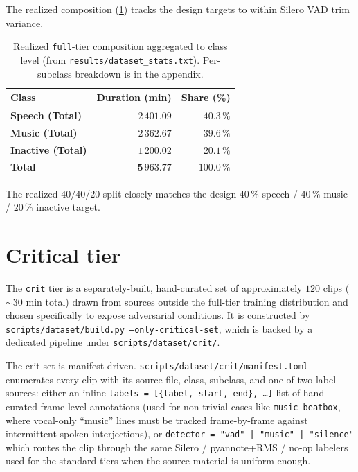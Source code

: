 The realized composition (\cref{tab:dataset_class_summary}) tracks the design targets to within Silero VAD trim variance.

\begin{table}[h]
\centering
\begin{tabular}{lrr}
\toprule
\textbf{Class} & \textbf{Duration (min)} & \textbf{Share (\%)} \\
\midrule
\textbf{Speech (Total)} & $2\,401.09$ & $40.3\,\%$ \\
\textbf{Music (Total)} & $2\,362.67$ & $39.6\,\%$ \\
\textbf{Inactive (Total)} & $1\,200.02$ & $20.1\,\%$ \\
\midrule
\textbf{Total} & $\mathbf{5\,963.77}$ & $100.0\,\%$ \\
\bottomrule
\end{tabular}
\caption{Realized \texttt{full}-tier composition aggregated to class level (from \texttt{results/dataset\_stats.txt}). Per-subclass breakdown is in the appendix.}
\label{tab:dataset_class_summary}
\end{table}

The realized $40 / 40 / 20$ split closely matches the design $40\,\%$ speech / $40\,\%$ music / $20\,\%$ inactive target.

\section{Critical tier}
\label{sec:dataset_critical_tier}

The \texttt{crit} tier is a separately-built, hand-curated set of approximately $120$ clips ($\sim 30$ min total) drawn from sources outside the full-tier training distribution and chosen specifically to expose adversarial conditions.
It is constructed by \texttt{scripts/dataset/build.py --only-critical-set}, which is backed by a dedicated pipeline under \texttt{scripts/dataset/crit/}.

The crit set is manifest-driven.
\texttt{scripts/dataset/crit/manifest.toml} enumerates every clip with its source file, class, subclass, and one of two label sources: either an inline \texttt{labels = [\{label, start, end\}, \dots]} list of hand-curated frame-level annotations (used for non-trivial cases like \texttt{music\_beatbox}, where vocal-only ``music'' lines must be tracked frame-by-frame against intermittent spoken interjections), or \texttt{detector = "vad" | "music" | "silence"} which routes the clip through the same Silero / pyannote+RMS / no-op labelers used for the standard tiers when the source material is uniform enough.

